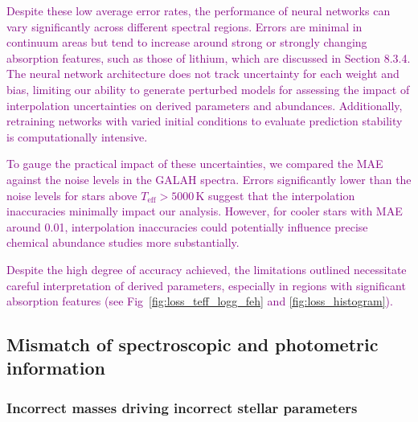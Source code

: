 \documentclass[
  journal=pasa,
  manuscript=research-paper, %
  year=2024,
  volume=37
]{cup-journal}
\newcommand{\adjusted}[1]{{\textcolor{purple}{#1}}}
\begin{document}
\adjusted{Despite these low average error rates, the performance of neural networks can vary significantly across different spectral regions. Errors are minimal in continuum areas but tend to increase around strong or strongly changing absorption features, such as those of lithium, which are discussed in Section 8.3.4. The neural network architecture does not track uncertainty for each weight and bias, limiting our ability to generate perturbed models for assessing the impact of interpolation uncertainties on derived parameters and abundances. Additionally, retraining networks with varied initial conditions to evaluate prediction stability is computationally intensive.}

\adjusted{To gauge the practical impact of these uncertainties, we compared the MAE against the noise levels in the GALAH spectra. Errors significantly lower than the noise levels for stars above $T_\mathrm{eff} > 5000\,\mathrm{K}$ suggest that the interpolation inaccuracies minimally impact our analysis. However, for cooler stars with MAE around 0.01, interpolation inaccuracies could potentially influence precise chemical abundance studies more substantially.}

\adjusted{Despite the high degree of accuracy achieved, the limitations outlined necessitate careful interpretation of derived parameters, especially in regions with significant absorption features (see Fig~\ref{fig:loss_teff_logg_feh} and \ref{fig:loss_histogram}).}

\subsection{Mismatch of spectroscopic and photometric information} \label{sec:caveats_photospec}

\subsubsection{Incorrect masses driving incorrect stellar parameters}
\end{document}
